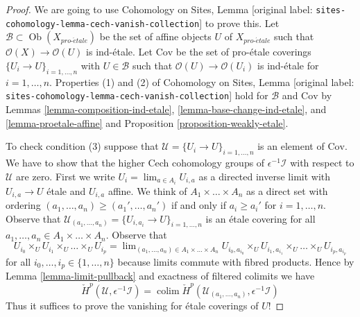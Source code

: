 \documentclass[10pt,a4paper]{article}
\theoremstyle{plain}
\theoremstyle{definition}
\theoremstyle{remark}
\numberwithin{equation}{subsection}
\def\lim{\mathop{\mathrm{lim}}\nolimits}
\def\colim{\mathop{\mathrm{colim}}\nolimits}
\def\Ob{\mathop{\mathrm{Ob}}\nolimits}
\def\proetale{{pro\text{-}\acute{e}tale}}
\begin{document}
\begin{proof}
We are going to use
Cohomology on Sites, Lemma \textnormal{[original label: \nolinkurl{sites-cohomology-lemma-cech-vanish-collection}]}
to prove this. Let $\mathcal{B} \subset \Ob(X_\proetale)$ be the set of affine
objects $U$ of $X_\proetale$ such that $\mathcal{O}(X) \to \mathcal{O}(U)$ is
ind-\'etale. Let $\text{Cov}$ be the set of pro-\'etale coverings
$\{U_i \to U\}_{i = 1, \ldots, n}$ with $U \in \mathcal{B}$ such that
$\mathcal{O}(U) \to \mathcal{O}(U_i)$ is ind-\'etale for $i = 1, \ldots, n$.
Properties (1) and (2) of
Cohomology on Sites, Lemma \textnormal{[original label: \nolinkurl{sites-cohomology-lemma-cech-vanish-collection}]}
hold for $\mathcal{B}$ and $\text{Cov}$ by
Lemmas \ref{lemma-composition-ind-etale},
\ref{lemma-base-change-ind-etale}, and
\ref{lemma-proetale-affine} and
Proposition \ref{proposition-weakly-etale}.

\medskip\noindent
To check condition (3) suppose that
$\mathcal{U} = \{U_i \to U\}_{i = 1, \ldots, n}$
is an element of $\text{Cov}$. We have to show that the higher
Cech cohomology groups of $\epsilon^{-1}\mathcal{I}$
with respect to $\mathcal{U}$ are zero.
First we write $U_i = \lim_{a \in A_i} U_{i, a}$ as a directed inverse limit
with $U_{i, a} \to U$ \'etale and $U_{i, a}$ affine.
We think of $A_1 \times \ldots \times A_n$ as a direct set
with ordering $(a_1, \ldots, a_n) \geq (a_1', \ldots, a_n')$
if and only if $a_i \geq a_i'$ for $i = 1, \ldots, n$.
Observe that
$\mathcal{U}_{(a_1, \ldots, a_n)} = \{U_{i, a_i} \to U\}_{i = 1, \ldots, n}$
is an \'etale covering for all
$a_1, \ldots, a_n \in A_1 \times \ldots \times A_n$.
Observe that
$$
U_{i_0} \times_U U_{i_1} \times_U \ldots \times_U U_{i_p}
=
\lim_{(a_1, \ldots, a_n) \in A_1 \times \ldots \times A_n}
U_{i_0, a_{i_0}} \times_U
U_{i_1, a_{i_1}} \times_U \ldots \times_U U_{i_p, a_{i_p}}
$$
for all $i_0, \ldots, i_p \in \{1, \ldots, n\}$ because limits
commute with fibred products. Hence by Lemma \ref{lemma-limit-pullback}
and exactness of filtered colimits we have
$$
\check{H}^p(\mathcal{U}, \epsilon^{-1}\mathcal{I}) =
\colim \check{H}^p(\mathcal{U}_{(a_1, \ldots, a_n)}, \epsilon^{-1}\mathcal{I}) 
$$
Thus it suffices to prove the vanishing for \'etale coverings
of $U$!


\end{proof}
\end{document}
